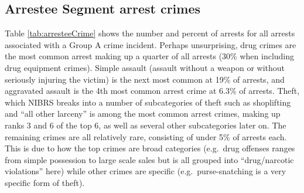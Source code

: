 \documentclass[
]{krantz}
\begin{document}
\subsection{Arrestee Segment arrest
crimes}\label{arrestee-segment-arrest-crimes}

Table \ref{tab:arresteeCrime} shows the number and percent
of arrests for all arrests associated with a Group A crime
incident. Perhaps unsurprising, drug crimes are the most
common arrest making up a quarter of all arrests (30\% when
including drug equipment crimes). Simple assault (assault
without a weapon or without seriously injuring the victim)
is the next most common at 19\% of arrests, and aggravated
assault is the 4th most common arrest crime at 6.3\% of
arrests. Theft, which NIBRS breaks into a number of
subcategories of theft such as shoplifting and ``all other
larceny'' is among the most common arrest crimes, making up
ranks 3 and 6 of the top 6, as well as several other
subcategories later on. The remaining crimes are all
relatively rare, consisting of under 5\% of arrests each.
This is due to how the top crimes are broad categories
(e.g.~drug offenses ranges from simple possession to large
scale sales but is all grouped into ``drug/narcotic
violations'' here) while other crimes are specific
(e.g.~purse-snatching is a very specific form of theft).
\end{document}
